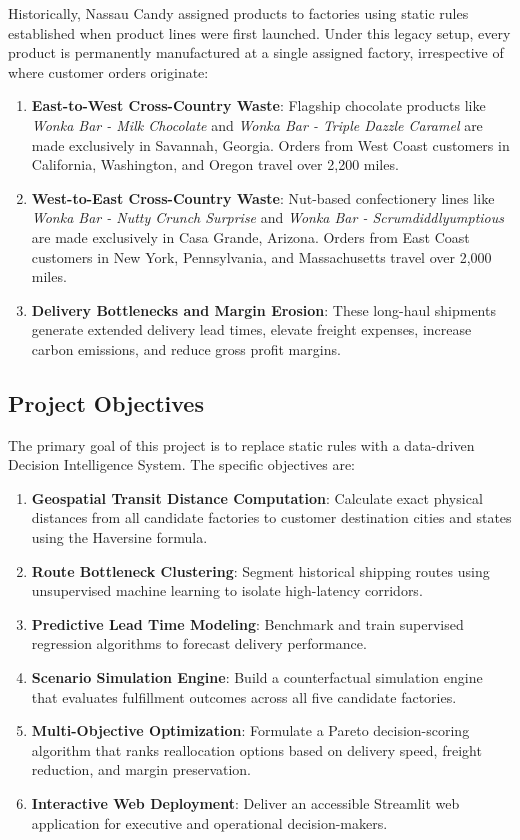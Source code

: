 \documentclass[12pt]{article}
\begin{document}
Historically, Nassau Candy assigned products to factories using static rules established when product lines were first launched. Under this legacy setup, every product is permanently manufactured at a single assigned factory, irrespective of where customer orders originate:
\begin{enumerate}
    \item \textbf{East-to-West Cross-Country Waste}: Flagship chocolate products like \textit{Wonka Bar - Milk Chocolate} and \textit{Wonka Bar - Triple Dazzle Caramel} are made exclusively in Savannah, Georgia. Orders from West Coast customers in California, Washington, and Oregon travel over 2,200 miles.
    \item \textbf{West-to-East Cross-Country Waste}: Nut-based confectionery lines like \textit{Wonka Bar - Nutty Crunch Surprise} and \textit{Wonka Bar - Scrumdiddlyumptious} are made exclusively in Casa Grande, Arizona. Orders from East Coast customers in New York, Pennsylvania, and Massachusetts travel over 2,000 miles.
    \item \textbf{Delivery Bottlenecks and Margin Erosion}: These long-haul shipments generate extended delivery lead times, elevate freight expenses, increase carbon emissions, and reduce gross profit margins.
\end{enumerate}

\subsection{Project Objectives}

The primary goal of this project is to replace static rules with a data-driven Decision Intelligence System. The specific objectives are:
\begin{enumerate}
    \item \textbf{Geospatial Transit Distance Computation}: Calculate exact physical distances from all candidate factories to customer destination cities and states using the Haversine formula.
    \item \textbf{Route Bottleneck Clustering}: Segment historical shipping routes using unsupervised machine learning to isolate high-latency corridors.
    \item \textbf{Predictive Lead Time Modeling}: Benchmark and train supervised regression algorithms to forecast delivery performance.
    \item \textbf{Scenario Simulation Engine}: Build a counterfactual simulation engine that evaluates fulfillment outcomes across all five candidate factories.
    \item \textbf{Multi-Objective Optimization}: Formulate a Pareto decision-scoring algorithm that ranks reallocation options based on delivery speed, freight reduction, and margin preservation.
    \item \textbf{Interactive Web Deployment}: Deliver an accessible Streamlit web application for executive and operational decision-makers.
\end{enumerate}
\end{document}
